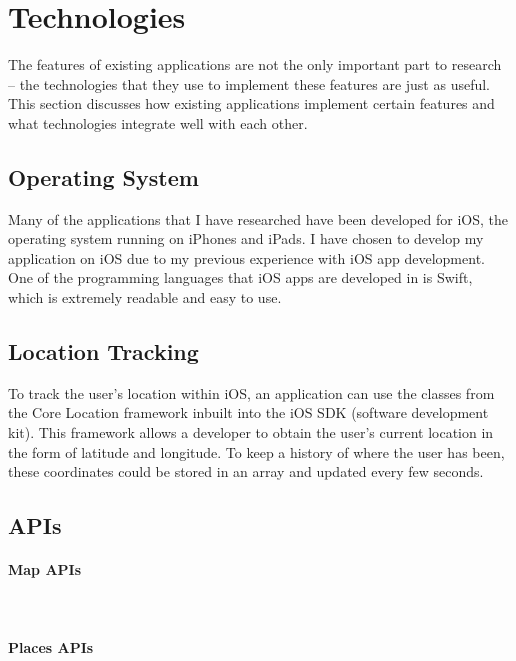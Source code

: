 \section{Technologies}

The features of existing applications are not the only important part to research -- the technologies that they use to implement these features are just as useful. This section discusses how existing applications implement certain features and what technologies integrate well with each other.

\subsection{Operating System}

Many of the applications that I have researched have been developed for iOS, the operating system running on iPhones and iPads. I have chosen to develop my application on iOS due to my previous experience with iOS app development. One of the programming languages that iOS apps are developed in is Swift, which is extremely readable and easy to use.

\subsection{Location Tracking}

To track the user's location within iOS, an application can use the classes from the Core Location framework \cite{AppleInc.} inbuilt into the iOS SDK (software development kit). This framework allows a developer to obtain the user's current location in the form of latitude and longitude. To keep a history of where the user has been, these coordinates could be stored in an array and updated every few seconds.


\subsection{APIs}

\paragraph{Map APIs}\mbox{}\\

\paragraph{Places APIs}


